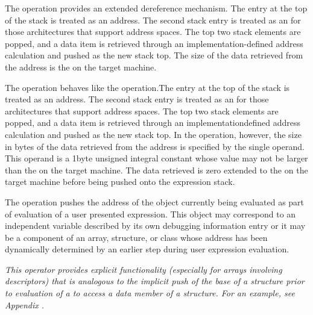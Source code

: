 \begin{enumerate}[1. ]
The  operation provides an extended dereference
mechanism. The entry at the top of the stack is treated as an
address. The second stack entry is treated as an  for those architectures that support
address spaces. The top two stack elements are popped,
and a data item is retrieved through an implementation-defined
address calculation and pushed as the new stack top. The size
of the data retrieved from the 
address is the
 on the target machine.

The  operation behaves like the
 operation.The entry at the top of the stack is
treated as an address. The second stack entry is treated as
an  for those architectures
that support 
address spaces. The top two stack
elements are popped, and a data item is retrieved through an
implementation\dash defined address calculation and pushed as the
new stack top. In the  operation, however,
the size in bytes of the data retrieved from the 
address is specified by the single operand. This operand is a
1\dash byte unsigned integral constant whose value may not be larger
than the  on the target machine. The data
retrieved is zero extended to the  on the
target machine before being pushed onto the expression stack.

The 
operation pushes the address
of the object currently being evaluated as part of evaluation
of a user presented expression. This object may correspond
to an independent variable described by its own debugging
information entry or it may be a component of an array,
structure, or class whose address has been dynamically
determined by an earlier step during user expression
evaluation.

\textit{This operator provides explicit functionality
(especially for arrays involving descriptors) that is analogous
to the implicit push of the base 
of a structure prior
to evaluation of a  to access a
data member of a structure. For an example, see 
Appendix .}


\end{enumerate}
